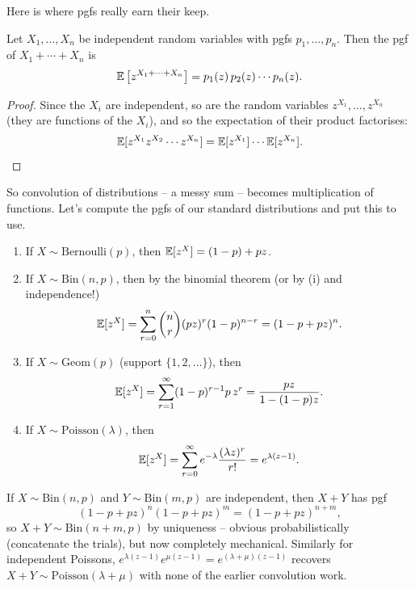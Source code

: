 \documentclass[a4paper]{scrartcl}
\begin{document}
Here is where pgfs really earn their keep.

\begin{theorem}
	Let $X_1, \dots, X_n$ be independent random variables with pgfs $p_1, \dots, p_n$. Then the pgf of $X_1 + \cdots + X_n$ is
	$$
	\mathbb{E}\left[z^{X_1 + \cdots + X_n}\right] = p_1(z)\, p_2(z) \cdots p_n(z).
	$$
\end{theorem}
\begin{proof}
	Since the $X_i$ are independent, so are the random variables $z^{X_1}, \dots, z^{X_n}$ (they are functions of the $X_i$), and so the expectation of their product factorises:
	$$
	\mathbb{E}[z^{X_1} z^{X_2} \cdots z^{X_n}] = \mathbb{E}[z^{X_1}]\cdots\mathbb{E}[z^{X_n}]. \qedhere
	$$
\end{proof}

So convolution of distributions -- a messy sum -- becomes multiplication of functions. Let's compute the pgfs of our standard distributions and put this to use.

\begin{example}
	\begin{enumerate}[label=(\roman*)]
		\item If $X \sim \mathrm{Bernoulli}(p)$, then $\mathbb{E}[z^X] = (1-p) + pz$.
		\item If $X \sim \mathrm{Bin}(n, p)$, then by the binomial theorem (or by (i) and independence!)
		$$
		\mathbb{E}[z^X] = \sum_{r=0}^{n}\binom{n}{r}(pz)^r (1-p)^{n - r} = (1 - p + pz)^n.
		$$
		\item If $X \sim \mathrm{Geom}(p)$ (support $\{1, 2, \dots\}$), then
		$$
		\mathbb{E}[z^X] = \sum_{r = 1}^{\infty} (1-p)^{r-1}p \, z^r = \frac{pz}{1 - (1-p)z}.
		$$
		\item If $X \sim \mathrm{Poisson}(\lambda)$, then
		$$
		\mathbb{E}[z^X] = \sum_{r = 0}^{\infty} e^{-\lambda}\frac{(\lambda z)^r}{r!} = e^{\lambda(z - 1)}.
		$$
	\end{enumerate}
\end{example}

\begin{example}
	If $X \sim \mathrm{Bin}(n, p)$ and $Y \sim \mathrm{Bin}(m, p)$ are independent, then $X + Y$ has pgf
	$$
	(1 - p + pz)^n (1 - p + pz)^m = (1 - p + pz)^{n + m},
	$$
	so $X + Y \sim \mathrm{Bin}(n + m, p)$ by uniqueness -- obvious probabilistically (concatenate the trials), but now completely mechanical. Similarly for independent Poissons, $e^{\lambda(z-1)}e^{\mu(z-1)} = e^{(\lambda + \mu)(z-1)}$ recovers $X + Y \sim \mathrm{Poisson}(\lambda + \mu)$ with none of the earlier convolution work.
\end{example}
\end{document}

